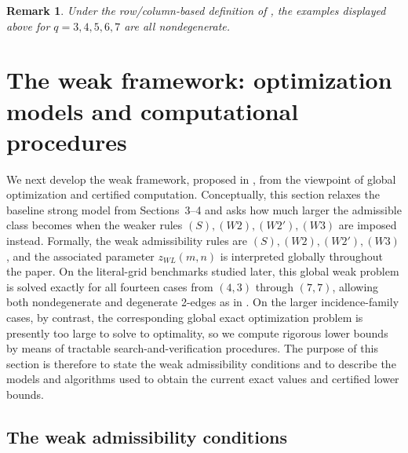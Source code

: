 \documentclass[10pt]{article}
\newcommand{\blue}[1]{#1}
\newcommand{\0}{\mathbf{0}}
\newcommand{\1}{\mathbf{1}}
\newtheorem{remark}[Thm]{Remark}
\begin{document}
\begin{remark}
Under the row/column-based definition of \cite{QCX26a}, the examples displayed above for \(q=3,4,5,6,7\) are all nondegenerate.
\end{remark}

\section{The weak framework: optimization models and computational procedures}

\blue{We next develop the weak framework, proposed in \cite{QCX26c}, from the viewpoint of global optimization and certified computation.} {Conceptually, this section relaxes the baseline strong model from Sections~3--4 and asks how much larger the admissible class becomes when the weaker rules \((S),(W2),(W2'),(W3)\) are imposed instead.} \blue{Formally, the weak admissibility rules are \((S),(W2),(W2'),(W3)\), and the associated parameter \(z_{WL}(m,n)\) is interpreted globally throughout the paper. On the literal-grid benchmarks studied later, this global weak problem is solved exactly for all fourteen cases from \((4,3)\) through \((7,7)\), allowing both nondegenerate and degenerate 2-edges as in \cite{QCX26c}. On the larger incidence-family cases, by contrast, the corresponding global exact optimization problem is presently too large to solve to optimality, so we compute rigorous lower bounds by means of tractable search-and-verification procedures. The purpose of this section is therefore to state the weak admissibility conditions and to describe the models and algorithms used to obtain the current exact values and certified lower bounds.}

\subsection*{The weak admissibility conditions}
\end{document}
